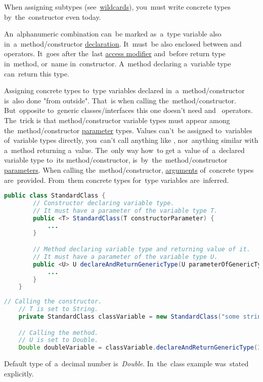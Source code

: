 \note When assigning subtypes (see~\hyperref[javagenericswildcards]{wildcards}), you~must write concrete types by~the~constructor even today.

\label{javagenericmethod}
An~alphanumeric combination can~be marked as~a~type variable also in~a~method/constructor \hyperref[declarationdefinition]{declaration}.
It~must~be also enclosed between  \mbox{and } operators.
It~goes after the~last \hyperref[javaaccessmodifiers]{access modifier} and~before return type in~method, or~name in~constructor.
A~method declaring a~variable type can~return this type.

Assigning concrete types to~type variables declared in~a~method/constructor is~also done "from outside".
That~is when calling the~method/constructor.
But~opposite to~generic classes/interfaces this one doesn't need  \mbox{and } operators.
The~trick is that method/constructor variable types must appear among the~method/constructor \hyperref[parameterargument]{parameter} types.
Values can't~be assigned to~variables of~variable types directly, you~can't call anything like , nor~anything similar with a~method returning a~value.
The~only way how~to get a~value of~a~declared variable type to~its method/constructor, is~by~the~method/constructor \hyperref[parameterargument]{parameters}.
When calling the~method/constructor, \hyperref[parameterargument]{arguments} of~concrete types are~provided.
From~them concrete types for~type variables are~inferred.

\begin{lstlisting}[language=Java, title={Class with constructor and method delcaring variable types}]
    public class StandardClass {
        // Constructor declaring variable type.
        // It must have a parameter of the variable type T.
        public <T> StandardClass(T constructorParameter) {
            ...
        }

        // Method declaring variable type and returning value of it.
        // It must have a parameter of the variable type U.
        public <U> U declareAndReturnGenericType(U parameterOfGenericType) {
            ...
        }
    }
\end{lstlisting}
\newpage

\begin{lstlisting}[language=Java, title={Concrete types assignment}]
    // Calling the constructor.
    // T is set to String.
    private StandardClass classVariable = new StandardClass("some string");

    // Calling the method.
    // U is set to Double.
    Double doubleVariable = classVariable.declareAndReturnGenericType(3.14);
\end{lstlisting}
\notenonl Default type of~a~decimal number \mbox{is \textit{Double}}.
In~the~class example  was~stated explicitly.

